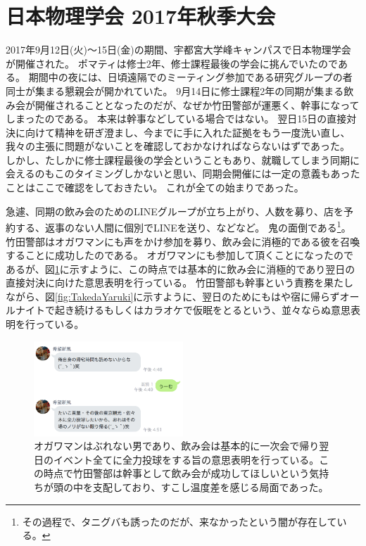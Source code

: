 \section{日本物理学会 2017年秋季大会}
2017年9月12日(火)〜15日(金)の期間、宇都宮大学峰キャンパスで日本物理学会が開催された。
ポマティは修士2年、修士課程最後の学会に挑んでいたのである。
期間中の夜には、日頃遠隔でのミーティング参加である研究グループの者同士が集まる懇親会が開かれていた。
9月14日に修士課程2年の同期が集まる飲み会が開催されることとなったのだが、なぜか竹田警部が運悪く、幹事になってしまったのである。
本来は幹事などしている場合ではない。
翌日15日の直接対決に向けて精神を研ぎ澄まし、今までに手に入れた証拠をもう一度洗い直し、我々の主張に問題がないことを確認しておかなければならないはずであった。
しかし、たしかに修士課程最後の学会ということもあり、就職してしまう同期に会えるのもこのタイミングしかないと思い、同期会開催には一定の意義もあったことはここで確認をしておきたい。
これが全ての始まりであった。
\par

急遽、同期の飲み会のためのLINEグループが立ち上がり、人数を募り、店を予約する、返事のない人間に個別でLINEを送り、などなど。
鬼の面倒である\footnote{その過程で、タニグバも誘ったのだが、来なかったという闇が存在している。}。
竹田警部はオガワマンにも声をかけ参加を募り、飲み会に消極的である彼を召喚することに成功したのである。
オガワマンにも参加して頂くことになったのであるが、図\ref{fig:OgawamanYaruki}に示すように、この時点では基本的に飲み会に消極的であり翌日の直接対決に向けた意思表明を行っている。
竹田警部も幹事という責務を果たしながら、図\ref{fig:TakedaYaruki}に示すように、翌日のためにもはや宿に帰らずオールナイトで起き続けるもしくはカラオケで仮眠をとるという、並々ならぬ意思表明を行っている。

\begin{figure}[htbp]
  \begin{center}
    \includegraphics[width=0.5\textwidth]{./section/sasakiLIVE/figures/OgawamanYaruki.png}
  \end{center}
  \caption{オガワマンはぶれない男であり、飲み会は基本的に一次会で帰り翌日のイベント全てに全力投球をする旨の意思表明を行っている。この時点で竹田警部は幹事として飲み会が成功してほしいという気持ちが頭の中を支配しており、すこし温度差を感じる局面であった。}
  \label{fig:OgawamanYaruki}
\end{figure}

